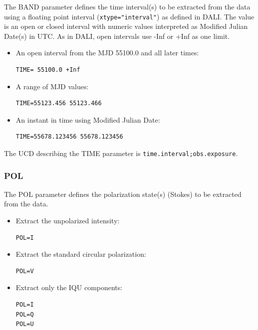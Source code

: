 \documentclass[11pt,a4paper]{ivoa}
\newcommand{\ucd}[1]{\texttt{#1}}
\begin{document}
The BAND parameter defines the time interval(s) to be extracted from the
data using a floating point interval (\verb|xtype="interval"|) as
defined in DALI.  The value is an open or closed
interval with numeric values interpreted as Modified Julian Date(s) in
UTC. As in DALI, open intervals use -Inf or +Inf as one limit.

\begin{itemize}
\item An open interval from the MJD 55100.0 and all later times:

\begin{lstlisting}
TIME= 55100.0 +Inf
\end{lstlisting}

\item A range of MJD values:

\begin{lstlisting}
TIME=55123.456 55123.466
\end{lstlisting}

\item An instant in time using Modified Julian Date:

\begin{lstlisting}
TIME=55678.123456 55678.123456
\end{lstlisting}
\end{itemize}

The UCD describing the TIME parameter is
\ucd{time.interval;obs.exposure}.


\subsubsection{POL}
\label{sec:POL}

The POL parameter defines the polarization state(s) (Stokes)
to be extracted from the data.

\begin{itemize}
\item Extract the unpolarized intensity:
\begin{lstlisting}
POL=I
\end{lstlisting}
\item Extract the standard circular polarization:
\begin{lstlisting}
POL=V
\end{lstlisting}

\item Extract only the IQU components:
\begin{lstlisting}
POL=I
POL=Q
POL=U
\end{lstlisting}
\end{itemize}
\end{document}

